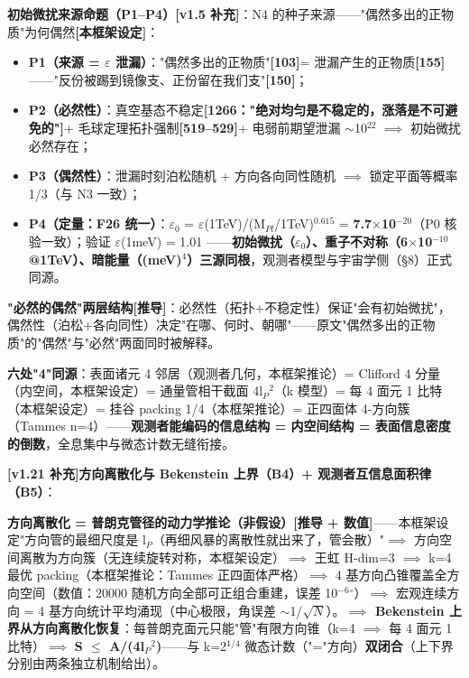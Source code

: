 \documentclass[12pt]{article}
\newcommand{\mtag}[1]{\textbf{[#1]}}
\newcommand{\up}[1]{\ensuremath{^{#1}}}
\newcommand{\down}[1]{\ensuremath{_{#1}}}
\begin{document}
\textbf{初始微扰来源命题（P1--P4）\mtag{v1.5 补充}}：N4 的种子来源------"偶然多出的正物质"为何偶然\mtag{本框架设定}：
\begin{itemize}
\item \textbf{P1（来源 = \ensuremath{\varepsilon} 泄漏）}："偶然多出的正物质"\mtag{103}= 泄漏产生的正物质\mtag{155}------"反份被踢到镜像支、正份留在我们支"\mtag{150}；
\item \textbf{P2（必然性）}：真空基态不稳定\mtag{1266："绝对均匀是不稳定的，涨落是不可避免的"}+ 毛球定理拓扑强制\mtag{519--529}+ 电弱前期望泄漏 \ensuremath{\sim}10\up{22} \ensuremath{\implies} 初始微扰必然存在；
\item \textbf{P3（偶然性）}：泄漏时刻泊松随机 + 方向各向同性随机 \ensuremath{\implies} 锁定平面等概率 1/3（与 N3 一致）；
\item \textbf{P4（定量：F26 统一）}：\ensuremath{\varepsilon}\down{0} = \ensuremath{\varepsilon}(1TeV)/(M\down{Pl}/1TeV)\up{0.615} = \textbf{7.7\ensuremath{\times}10\up{-20}}（P0 核验一致）；验证 \ensuremath{\varepsilon}(1meV) = 1.01 \checkmark------\textbf{初始微扰（\ensuremath{\varepsilon}\down{0}）、重子不对称（6\ensuremath{\times}10\up{-10} @1TeV）、暗能量（(meV)\up{4}）三源同根}，观测者模型与宇宙学侧（\S{}8）正式同源。
\end{itemize}

\textbf{"必然的偶然"两层结构\mtag{推导}}：必然性（拓扑+不稳定性）保证"会有初始微扰"，偶然性（泊松+各向同性）决定"在哪、何时、朝哪"------原文"偶然多出的正物质"的"偶然"与"必然"两面同时被解释。

\textbf{六处"4"同源}：表面诸元 4 邻居（观测者几何，本框架推论）= Clifford 4 分量（内空间，本框架设定）= 通量管相干截面 4l\down{P}\up{2}（k 模型）= 每 4 面元 1 比特（本框架设定）= 挂谷 packing 1/4（本框架推论）= 正四面体 4-方向簇（Tammes n=4）------\textbf{观测者能编码的信息结构 = 内空间结构 = 表面信息密度的倒数}，全息集中与微态计数无缝衔接。

\textbf{\mtag{v1.21 补充}方向离散化与 Bekenstein 上界（B4）+ 观测者互信息面积律（B5）}：

\textbf{方向离散化 = 普朗克管径的动力学推论（非假设）}\mtag{推导 + 数值}------本框架设定"方向管的最细尺度是 l\down{P}（再细风暴的离散性就出来了，管会散）"\ensuremath{\implies} 方向空间离散为方向簇（无连续旋转对称，本框架设定）\ensuremath{\implies} 王虹 H-dim=3 \ensuremath{\implies} k=4 最优 packing（本框架推论：Tammes 正四面体严格）\ensuremath{\implies} 4 基方向凸锥覆盖全方向空间（数值：20000 随机方向全部可正组合重建，误差 10\up{-6}\ensuremath{^{\circ}}）\ensuremath{\implies} 宏观连续方向 = 4 基方向统计平均涌现（中心极限，角误差 \ensuremath{\sim}1/\ensuremath{\sqrt{N}}）。\textbf{\ensuremath{\implies} Bekenstein 上界从方向离散化恢复}：每普朗克面元只能"管"有限方向锥（k=4 \ensuremath{\implies} 每 4 面元 1 比特）\ensuremath{\implies} \textbf{S \ensuremath{\leq} A/(4l\down{P}\up{2})}------与 k=2\up{1/4} 微态计数（"="方向）\textbf{双闭合}（上下界分别由两条独立机制给出）。
\end{document}
